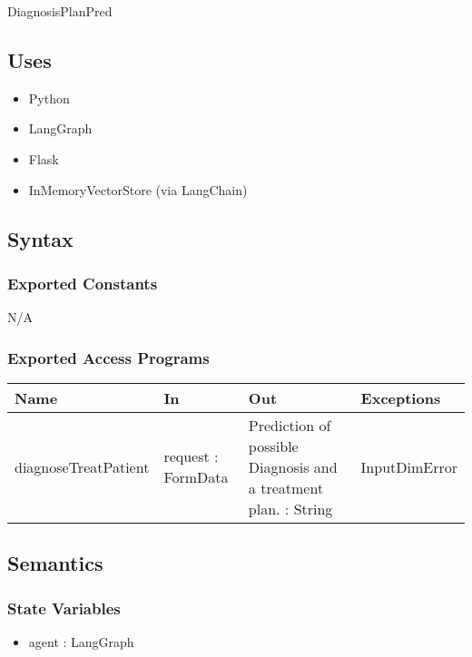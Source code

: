\documentclass[12pt, titlepage]{article}
\begin{document}
DiagnosisPlanPred

\subsection{Uses}
\begin{itemize}
  \item Python
  \item LangGraph
  \item Flask
  \item InMemoryVectorStore (via LangChain)
\end{itemize}

\subsection{Syntax}

\subsubsection{Exported Constants}
N/A

\subsubsection{Exported Access Programs}

\begin{center}
\begin{tabular}{p{3cm} p{4cm} p{4cm} p{3cm}}
\hline
\textbf{Name} & \textbf{In} & \textbf{Out} & \textbf{Exceptions} \\
\hline
diagnoseTreatPatient & request : FormData & Prediction of possible Diagnosis and a treatment plan. : String & InputDimError \\
\hline
\end{tabular}
\end{center}

\subsection{Semantics}

\subsubsection{State Variables}

\begin{itemize}
  \item agent : LangGraph
\end{itemize}
\end{document}
